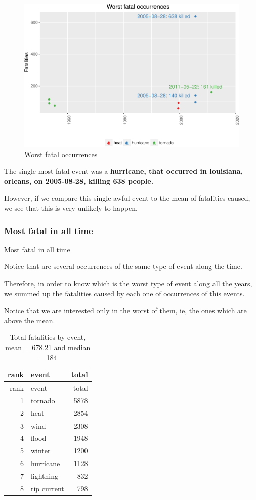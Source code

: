 \documentclass[]{article}
\begin{document}
\begin{figure}[htbp]
\centering
\includegraphics{readme_files/figure-latex/fatal-plot-single-1.pdf}
\caption{Worst fatal occurrences}
\end{figure}

The single most fatal event was a \textbf{hurricane, that occurred in
louisiana, orleans, on 2005-08-28, killing 638 people.}

However, if we compare this single awful event to the mean of fatalities
caused, we see that this is very unlikely to happen.

\subsubsection{Most fatal in all time}\label{most-fatal-in-all-time}

Most fatal in all time

Notice that are several occurrences of the same type of event along the
time.

Therefore, in order to know which is the worst type of event along all
the years, we summed up the fatalities caused by each one of occurrences
of this events.

Notice that we are interested only in the worst of them, ie, the ones
which are above the mean.

\begin{longtable}[]{@{}rlr@{}}
\caption{Total fatalities by event, mean = 678.21 and median =
184}\tabularnewline
\toprule
rank & event & total\tabularnewline
\midrule
\endfirsthead
\toprule
rank & event & total\tabularnewline
\midrule
\endhead
1 & tornado & 5878\tabularnewline
2 & heat & 2854\tabularnewline
3 & wind & 2308\tabularnewline
4 & flood & 1948\tabularnewline
5 & winter & 1200\tabularnewline
6 & hurricane & 1128\tabularnewline
7 & lightning & 832\tabularnewline
8 & rip current & 798\tabularnewline
\bottomrule
\end{longtable}
\end{document}

